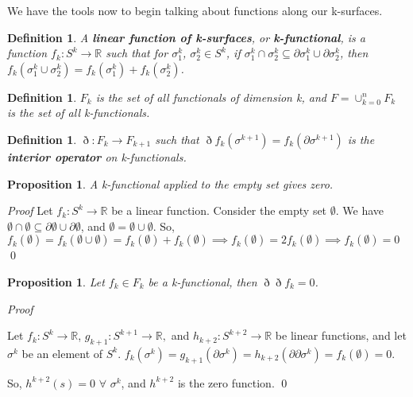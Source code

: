 \documentclass{book}
\newtheorem{defn}[equation]{Definition}
\newtheorem{prop}[equation]{Proposition}
\renewenvironment{proof}{\emph{Proof}}{\qed}
\begin{document}
We have the tools now to begin talking about functions along our k-surfaces. 


\begin{defn}
	A \textbf{linear function of k-surfaces}, or \textbf{k-functional}, is a function $f_k : S^k \to \mathbb{R}$ such that for $\sigma^k_1$, $\sigma^k_2 \in S^k$, if $\sigma^k_1 \cap \sigma^k_2 \subseteq \partial \sigma^k_1 \cup \partial \sigma^k_2$, then $f_k(\sigma^k_1\cup \sigma^k_2) = f_k(\sigma^k_1) + f_k(\sigma^k_2)$. 
\end{defn}

\begin{defn}
	$F_k$ is the set of all functionals of dimension k, and $F = \cup_{k=0}^nF_k$ is the set of all k-functionals. 
\end{defn}


\begin{defn}
	$\eth : F_k \to F_{k+1}$ such that $\eth f_k(\sigma^{k+1}) = f_k(\partial \sigma^{k+1})$ is the \textbf{interior operator} on k-functionals. 
\end{defn}

\begin{prop}
	A k-functional applied to the empty set gives zero. 
\end{prop}
\begin{proof}
	Let $f_k : S^k \to \mathbb{R}$ be a linear function. Consider the empty set $\emptyset$. 
We have $\emptyset \cap \emptyset \subseteq \partial\emptyset \cup \partial\emptyset$, and $\emptyset = \emptyset\cup\emptyset$. 
So, $f_k(\emptyset) = f_k(\emptyset\cup\emptyset) = f_k(\emptyset) + f_k(\emptyset) \implies f_k(\emptyset) = 2f_k(\emptyset) \implies f_k(\emptyset) = 0$
\end{proof}



\begin{prop}
	Let $f_k \in F_k$ be a k-functional, then $\eth\eth f_k = 0 $.
	
	
\end{prop}
\begin{proof}


	Let $f_k : S^k \to \mathbb{R}$, $g_{k+1} : S^{k+1} \to \mathbb{R},$ and $h_{k+2}: S^{k+2} \to \mathbb{R}$ be linear functions, and let $\sigma^k$ be an element of $S^k$. $f_k(\sigma^k) = g_{k+1}(\partial \sigma^k) = h_{k+2}(\partial\partial \sigma^k) = f_k(\emptyset) = 0$. 
	
	So, $h^{k+2}(s) = 0$ $\forall$ $\sigma^k$, and $h^{k+2}$ is the zero function. 
\end{proof}
\end{document}
